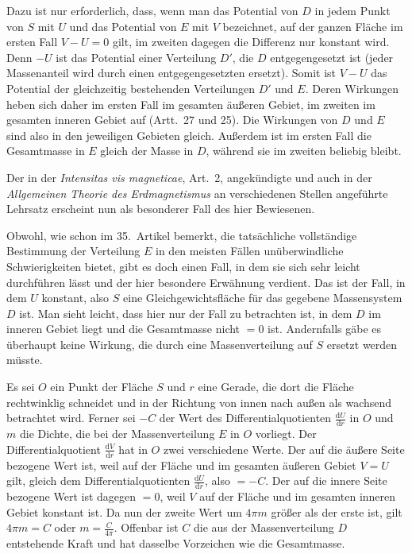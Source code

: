 Dazu ist nur erforderlich, dass, wenn man das Potential von $D$ in jedem Punkt von $S$ mit $U$ und das Potential von $E$ mit $V$ bezeichnet, auf der ganzen Fläche im ersten Fall $V-U=0$ gilt, im zweiten dagegen die Differenz nur konstant wird. Denn $-U$ ist das Potential einer Verteilung $D'$, die $D$ entgegengesetzt ist (jeder Massenanteil wird durch einen entgegengesetzten ersetzt). Somit ist $V-U$ das Potential der gleichzeitig bestehenden Verteilungen $D'$ und $E$. Deren Wirkungen heben sich daher im ersten Fall im gesamten äußeren Gebiet, im zweiten im gesamten inneren Gebiet auf (Artt.\ 27 und 25). Die Wirkungen von $D$ und $E$ sind also in den jeweiligen Gebieten gleich. Außerdem ist im ersten Fall die Gesamtmasse in $E$ gleich der Masse in $D$, während sie im zweiten beliebig bleibt.

Der in der \textit{Intensitas vis magneticae}, Art.\ 2, angekündigte und auch in der \textit{Allgemeinen Theorie des Erdmagnetismus} an verschiedenen Stellen angeführte Lehrsatz erscheint nun als besonderer Fall des hier Bewiesenen.

Obwohl, wie schon im 35.\ Artikel bemerkt, die tatsächliche vollständige Bestimmung der Verteilung $E$ in den meisten Fällen unüberwindliche Schwierigkeiten bietet, gibt es doch einen Fall, in dem sie sich sehr leicht durchführen lässt und der hier besondere Erwähnung verdient. Das ist der Fall, in dem $U$ konstant, also $S$ eine Gleichgewichtsfläche für das gegebene Massensystem $D$ ist. Man sieht leicht, dass hier nur der Fall zu betrachten ist, in dem $D$ im inneren Gebiet liegt und die Gesamtmasse nicht $=0$ ist. Andernfalls gäbe es überhaupt keine Wirkung, die durch eine Massenverteilung auf $S$ ersetzt werden müsste.

Es sei $O$ ein Punkt der Fläche $S$ und $r$ eine Gerade, die dort die Fläche rechtwinklig schneidet und in der Richtung von innen nach außen als wachsend betrachtet wird. Ferner sei $-C$ der Wert des Differentialquotienten $\frac{\mathrm dU}{\mathrm dr}$ in $O$ und $m$ die Dichte, die bei der Massenverteilung $E$ in $O$ vorliegt. Der Differentialquotient $\frac{\mathrm dV}{\mathrm dr}$ hat in $O$ zwei verschiedene Werte. Der auf die äußere Seite bezogene Wert ist,
weil auf der Fläche und im gesamten äußeren Gebiet $V=U$ gilt, gleich dem Differentialquotienten $\frac{\mathrm dU}{\mathrm dr}$, also $=-C$. Der auf die innere Seite bezogene Wert ist dagegen $=0$, weil $V$ auf der Fläche und im gesamten inneren Gebiet konstant ist. Da nun der zweite Wert um $4\pi m$ größer als der erste ist, gilt $4\pi m=C$ oder $m=\frac C{4\pi}$. Offenbar ist $C$ die aus der Massenverteilung $D$ entstehende Kraft und hat dasselbe Vorzeichen wie die Gesamtmasse.

